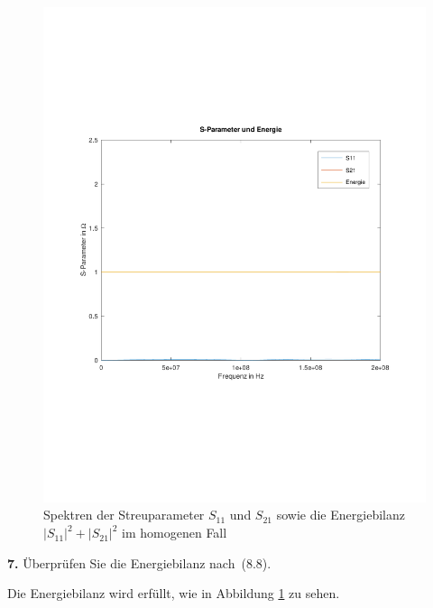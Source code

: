 \documentclass[Protokollheft.tex]{subfiles}
\begin{document}
\begin{figure}
	\centering
	\includegraphics[trim = 15mm 65mm 15mm 65mm, clip,width=0.7\linewidth]{SParameterEnergie}
	\caption{Spektren der Streuparameter $S_{11}$ und $S_{21}$ sowie die Energiebilanz $|S_{11}|^2 + |S_{21}|^2$ im homogenen Fall}
	\label{fig:sparameterenergie}
\end{figure}


\begin{framed}
	\noindent \textbf{7.} Überprüfen Sie die Energiebilanz nach~(8.8).\label{exer:checkEnergyBal4TLine}
\end{framed}
\noindent
Die Energiebilanz wird erfüllt, wie in Abbildung \ref{fig:sparameterenergie} zu sehen.
\end{document}
